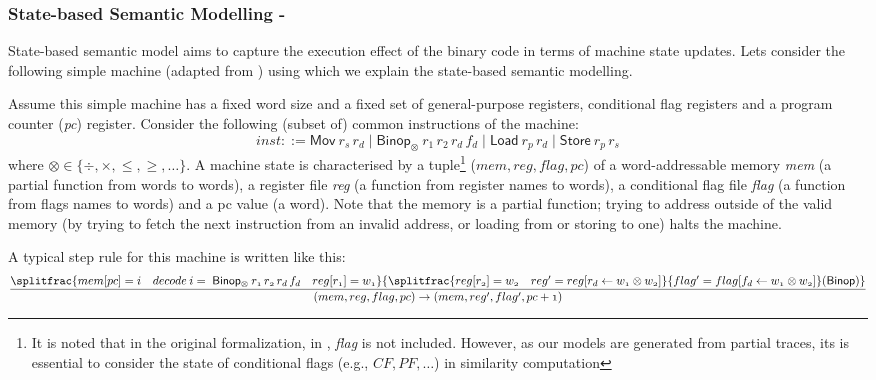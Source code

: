 \subsubsection{State-based Semantic Modelling - } \label{subsubsec:stat_sem}
State-based semantic model aims to capture the execution effect of the binary code in terms of machine state updates. Lets consider the following simple machine (adapted from \cite{de2015micro}) using which we explain the state-based semantic modelling.

Assume this simple machine has a fixed word size and a fixed set of general-purpose registers, conditional flag registers and a program counter (\textit{pc}) register. Consider the following (subset of) common instructions of the machine:
\begin{equation*}
inst ::= \mathsf{Mov} \: r_s\, r_d\; \vert \; \mathsf{Binop_\otimes} \: r_1\, r_2\, r_d\,f_d \; \vert \; \mathsf{Load} \: r_p\, r_d\; \vert \; \mathsf{Store} \: r_p\, r_s 
\end{equation*}
where $\otimes \in \lbrace \div, \times, \leq, \geq, \ldots\rbrace$. A machine state is characterised by a tuple\footnote{It is noted that in the original formalization, in \cite{de2015micro}, \textit{flag} is not included. However, as our models are generated from partial traces, its is essential to consider the state of conditional flags (e.g., $CF, PF, \ldots$) in similarity computation} ($mem, reg, flag, pc$) of a word-addressable memory \textit{mem} (a partial function from words to words), a register file \textit{reg} (a function from register names to words), a conditional flag file \textit{flag} (a function from flags names to words) and a pc value (a word). Note that the memory is a partial function; trying to address outside of the valid memory (by trying to fetch the next instruction from an invalid address, or loading from or storing to one) halts the machine.

A typical step rule for this machine is written like this:
\begin{equation*}
\begin{aligned}
\mathnormal{\frac{ \splitfrac{mem[pc]=i \quad decode \: i = \; \mathsf{Binop_\otimes} \: r_1\, r_2\, r_d\,f_d \quad reg[r_1]=w_1}{\splitfrac{reg[r_2]=w_2 \quad reg^\prime = reg[r_d \leftarrow w_1 \otimes w_2]}{flag^\prime = flag[f_d \leftarrow w_1 \otimes w_2]\hfill}\hfill \mathsf{(Binop)}}}{(mem, reg, flag, pc) \rightarrow (mem, reg^\prime, flag^\prime, pc+1)}}
\end{aligned}
\end{equation*}

